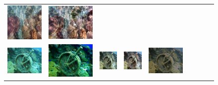 \begin{figure}[t]
\begin{center}
\begin{tabular}{ccccccccc}
        \includegraphics[width = 0.10\linewidth,height=0.10\linewidth]{figures/ch3/compare/UIEB/Ushape/161_img_.png}& \hspace{-0.40cm} 
        \includegraphics[width = 0.10\linewidth,height=0.10\linewidth]{figures/ch3/compare/UIEB/Ours/161_img_.png}  \\

        \includegraphics[width = 0.10\linewidth,height=0.10\linewidth]{figures/ch3/compare/UIEB/Input/41_img_.png} & \hspace{-0.40cm}
        \includegraphics[width = 0.10\linewidth,height=0.10\linewidth]{figures/ch3/compare/UIEB/UDCP/41_img_.png}  & \hspace{-0.40cm}
        \includegraphics[width = 0.10\linewidth,height=0.10\linewidth]{figures/ch3/compare/UIEB/UGAN/41_img_.png}  & \hspace{-0.40cm}
        \includegraphics[width = 0.10\linewidth,height=0.10\linewidth]{figures/ch3/compare/UIEB/FGAN/41_img_.png}  & \hspace{-0.40cm}
        \includegraphics[width = 0.10\linewidth,height=0.10\linewidth]{figures/ch3/compare/UIEB/UWCNN/41_img_.png} & \hspace{-0.40cm}

\end{tabular}
\end{center}
\end{figure}
